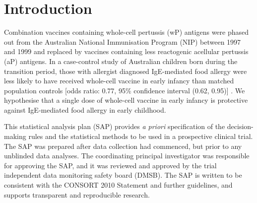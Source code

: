 \documentclass{bmcart}
\begin{document}


\section*{Introduction}

Combination vaccines containing whole-cell pertussis (wP) antigens were phased out from the Australian National Immunisation Program (NIP) between 1997 and 1999 and replaced by vaccines containing less reactogenic acellular pertussis (aP) antigens.
In a case-control study of Australian children born during the transition period, those with allergist diagnosed IgE-mediated food allergy were less likely to have received whole-cell vaccine in early infancy than matched population controls [odds ratio: 0.77, 95\% confidence interval (0.62, 0.95)] \cite{estcourt2020whole}.
We hypothesise that a single dose of whole-cell vaccine in early infancy is protective against IgE-mediated food allergy in early childhood.

This statistical analysis plan (SAP) provides \textit{a priori} specification of the decision-making rules and the statistical methods to be used in a prospective clinical trial. 
The SAP was prepared after data collection had commenced, but prior to any unblinded data analyses. 
The coordinating principal investigator was responsible for approving the SAP, and it was reviewed and approved by the trial independent data monitoring safety board (DMSB). 
The SAP is written to be consistent with the CONSORT 2010 Statement and further guidelines, and supports transparent and reproducible research.
\end{document}
